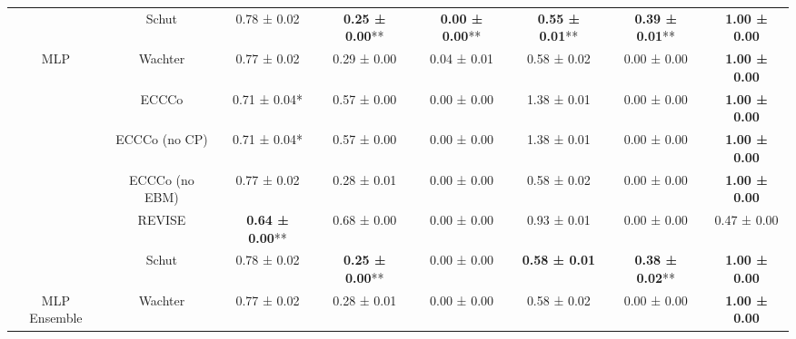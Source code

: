 \begin{table}
{\begin{tabular}[t]{cccccccc}
 & Schut & 0.78 ± 0.02\hphantom{*}\hphantom{*} & \textbf{0.25 ± 0.00}** & \textbf{0.00 ± 0.00}** & \textbf{0.55 ± 0.01}** & \textbf{0.39 ± 0.01}** & \textbf{1.00 ± 0.00}\hphantom{*}\hphantom{*}\\

\multirow[t]{-6}{*}{\centering\arraybackslash MLP} & Wachter & 0.77 ± 0.02\hphantom{*}\hphantom{*} & 0.29 ± 0.00\hphantom{*}\hphantom{*} & 0.04 ± 0.01\hphantom{*}\hphantom{*} & 0.58 ± 0.02\hphantom{*}\hphantom{*} & 0.00 ± 0.00\hphantom{*}\hphantom{*} & \textbf{1.00 ± 0.00}\hphantom{*}\hphantom{*}\\
\cmidrule{1-8}
 & ECCCo & 0.71 ± 0.04*\hphantom{*} & 0.57 ± 0.00\hphantom{*}\hphantom{*} & 0.00 ± 0.00\hphantom{*}\hphantom{*} & 1.38 ± 0.01\hphantom{*}\hphantom{*} & 0.00 ± 0.00\hphantom{*}\hphantom{*} & \textbf{1.00 ± 0.00}\hphantom{*}\hphantom{*}\\

 & ECCCo (no CP) & 0.71 ± 0.04*\hphantom{*} & 0.57 ± 0.00\hphantom{*}\hphantom{*} & 0.00 ± 0.00\hphantom{*}\hphantom{*} & 1.38 ± 0.01\hphantom{*}\hphantom{*} & 0.00 ± 0.00\hphantom{*}\hphantom{*} & \textbf{1.00 ± 0.00}\hphantom{*}\hphantom{*}\\

 & ECCCo (no EBM) & 0.77 ± 0.02\hphantom{*}\hphantom{*} & 0.28 ± 0.01\hphantom{*}\hphantom{*} & 0.00 ± 0.00\hphantom{*}\hphantom{*} & 0.58 ± 0.02\hphantom{*}\hphantom{*} & 0.00 ± 0.00\hphantom{*}\hphantom{*} & \textbf{1.00 ± 0.00}\hphantom{*}\hphantom{*}\\

 & REVISE & \textbf{0.64 ± 0.00}** & 0.68 ± 0.00\hphantom{*}\hphantom{*} & 0.00 ± 0.00\hphantom{*}\hphantom{*} & 0.93 ± 0.01\hphantom{*}\hphantom{*} & 0.00 ± 0.00\hphantom{*}\hphantom{*} & 0.47 ± 0.00\hphantom{*}\hphantom{*}\\

 & Schut & 0.78 ± 0.02\hphantom{*}\hphantom{*} & \textbf{0.25 ± 0.00}** & 0.00 ± 0.00\hphantom{*}\hphantom{*} & \textbf{0.58 ± 0.01}\hphantom{*}\hphantom{*} & \textbf{0.38 ± 0.02}** & \textbf{1.00 ± 0.00}\hphantom{*}\hphantom{*}\\

\multirow[t]{-6}{*}{\centering\arraybackslash MLP Ensemble} & Wachter & 0.77 ± 0.02\hphantom{*}\hphantom{*} & 0.28 ± 0.01\hphantom{*}\hphantom{*} & 0.00 ± 0.00\hphantom{*}\hphantom{*} & 0.58 ± 0.02\hphantom{*}\hphantom{*} & 0.00 ± 0.00\hphantom{*}\hphantom{*} & \textbf{1.00 ± 0.00}\hphantom{*}\hphantom{*}\\
\bottomrule
\end{tabular}}
\end{table}
